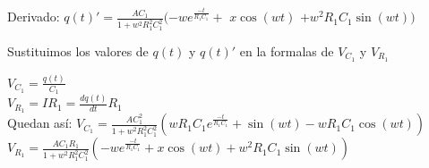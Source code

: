 \documentclass[12pt]{article}
\newcommand{\Respuesta}[1]{\textcolor{ColorRespuesta}{#1}}
\newcommand{\derivada}[2]{\displaystyle{\frac{d#1}{d#2}}}
\newcommand{\e}[1]{e^{#1}}
\newcommand{\escribir}[1]{\singlespacing#1\singlespacing}
\newcommand{\fraccion}[2]{\displaystyle\frac{#1}{#2}}
\begin{document}
	\escribir{Derivado:}
	\Respuesta{
	$q(t)'=\fraccion{AC_1}{1+w^2R_1^2C_1^2}(-w\e{\frac{-t}{R_1C_1}}+$
	$x\cos(wt)$%
	$+w^2R_1C_1\sin(wt))$\\
	}
		
	\escribir{Sustituimos los valores de $q(t)$ y $q(t)'$  en la formalas de $V_{C_1}$ y $V_{R_1}$ }

	$V_{C_1}=\displaystyle{\frac{q(t)}{C_1}} $\\

	$V_{R_1}=IR_1=\derivada{q(t)}{t}R_1$\\

	\escribir{Quedan así:}
	$V_{C_1}=\fraccion{AC_1^2}{1+w^2R_1^2C_1^2}(wR_1C_1\e{\frac{-t}{R_1C_1}}+\sin(wt)-wR_1C_1\cos(wt))$\\
	
	\Respuesta{
	$V_{R_1}=\fraccion{AC_1R_1}{1+w^2R_1^2C_1^2}(-w\e{\frac{-t}{R_1C_1}}+x\cos(wt)+w^2R_1C_1\sin(wt))$\\
	}

\end{document}
